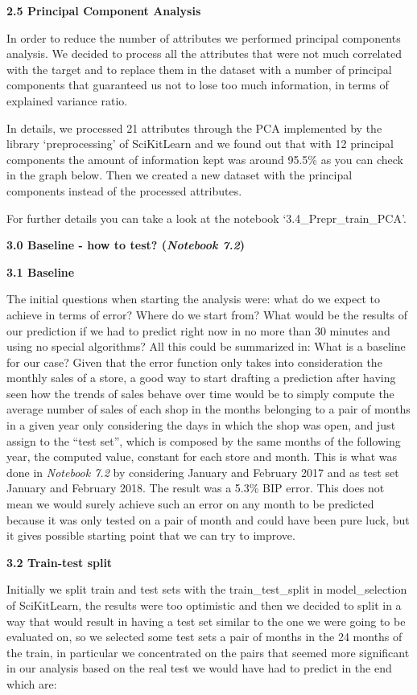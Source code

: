 \documentclass[]{article}
\begin{document}
\textbf{2.5 Principal Component Analysis}

In order to reduce the number of attributes we performed principal
components analysis. We decided to process all the attributes that were
not much correlated with the target and to replace them in the dataset
with a number of principal components that guaranteed us not to lose too
much information, in terms of explained variance ratio.

In details, we processed 21 attributes through the PCA implemented by
the library `preprocessing' of SciKitLearn and we found out that with 12
principal components the amount of information kept was around 95.5\% as
you can check in the graph below. Then we created a new dataset with the
principal components instead of the processed attributes.

For further details you can take a look at the notebook
`3.4\_Prepr\_train\_PCA'.

\protect\hypertarget{_19kisxyeqwf1}{}{}\textbf{3.0 Baseline - how to
test? (\emph{Notebook 7.2})}

\protect\hypertarget{_og69v0ylidgg}{}{}\textbf{3.1 Baseline}

The initial questions when starting the analysis were: what do we expect
to achieve in terms of error? Where do we start from? What would be the
results of our prediction if we had to predict right now in no more than
30 minutes and using no special algorithms? All this could be summarized
in: What is a baseline for our case? Given that the error function only
takes into consideration the monthly sales of a store, a good way to
start drafting a prediction after having seen how the trends of sales
behave over time would be to simply compute the average number of sales
of each shop in the months belonging to a pair of months in a given year
only considering the days in which the shop was open, and just assign to
the ``test set'', which is composed by the same months of the following
year, the computed value, constant for each store and month. This is
what was done in \emph{Notebook 7.2} by considering January and February
2017 and as test set January and February 2018. The result was a 5.3\%
BIP error. This does not mean we would surely achieve such an error on
any month to be predicted because it was only tested on a pair of month
and could have been pure luck, but it gives possible starting point that
we can try to improve.

\textbf{3.2 Train-test split}

Initially we split train and test sets with the train\_test\_split in
model\_selection of SciKitLearn, the results were too optimistic and
then we decided to split in a way that would result in having a test set
similar to the one we were going to be evaluated on, so we selected some
test sets a pair of months in the 24 months of the train, in particular
we concentrated on the pairs that seemed more significant in our
analysis based on the real test we would have had to predict in the end
which are:
\end{document}
